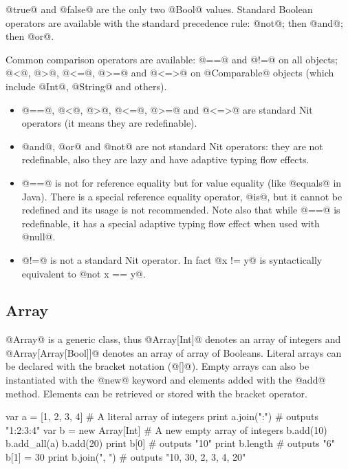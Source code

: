 @true@ and @false@ are the only two @Bool@ values.
Standard Boolean operators are available with the standard precedence rule: @not@; then @and@; then @or@.

Common comparison operators are available: @==@ and @!=@ on all objects; @<@, @>@, @<=@, @>=@ and @<=>@ on @Comparable@ objects (which include @Int@, @String@ and others). 

\begin{itemize}
\item @==@, @<@, @>@, @<=@, @>=@ and @<=>@ are standard Nit operators (it means they are redefinable).
\item @and@, @or@ and @not@ are not standard Nit operators: they are not redefinable, also they are lazy and have adaptive typing flow effects.
\item @==@ is not for reference equality but for value equality (like @equals@ in Java).
There is a special reference equality operator, @is@, but it cannot be redefined and its usage is not recommended.
Note also that while @==@ is redefinable, it has a special adaptive typing flow effect when used with @null@.
\item @!=@ is not a standard Nit operator. In fact @x != y@ is syntactically equivalent to @not x == y@.
\end{itemize}

\subsection{Array}\label{Array}

@Array@ is a generic class, thus @Array[Int]@ denotes an array of integers and @Array[Array[Bool]]@ denotes an array of array of Booleans.
Literal arrays can be declared with the bracket notation (@[]@).
Empty arrays can also be instantiated with the @new@ keyword and elements added with the @add@ method.
Elements can be retrieved or stored with the bracket operator.

\begin{lst}
var a = [1, 2, 3, 4] # A literal array of integers
print a.join(":") # outputs "1:2:3:4"
var b = new Array[Int] # A new empty array of integers
b.add(10)
b.add_all(a)
b.add(20)
print b[0] # outputs "10"
print b.length # outputs "6"
b[1] = 30
print b.join(", ") # outputs "10, 30, 2, 3, 4, 20"
\end{lst}


